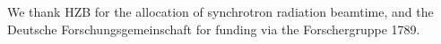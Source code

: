 \begin{acknowledgement}
%
We thank HZB for the allocation of synchrotron radiation beamtime, and the Deutsche Forschungsgemeinschaft for funding via the Forschergruppe 1789.
%
\end{acknowledgement}
